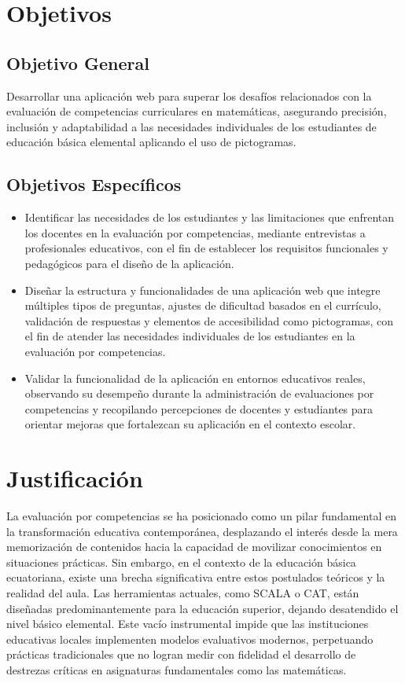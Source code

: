 \section{Objetivos}

\subsection{Objetivo General}

Desarrollar una aplicación web para superar los desafíos relacionados con la evaluación de competencias curriculares en matemáticas, asegurando precisión, inclusión y adaptabilidad a las necesidades individuales de los estudiantes de educación básica elemental aplicando el uso de pictogramas.

\subsection{Objetivos Específicos}

\begin{itemize}[leftmargin=*]
  \item Identificar las necesidades de los estudiantes y las limitaciones que enfrentan los docentes en la evaluación por competencias, mediante entrevistas a profesionales educativos, con el fin de establecer los requisitos funcionales y pedagógicos para el diseño de la aplicación.
  \item Diseñar la estructura y funcionalidades de una aplicación web que integre múltiples tipos de preguntas, ajustes de dificultad basados en el currículo, validación de respuestas y elementos de accesibilidad como pictogramas, con el fin de atender las necesidades individuales de los estudiantes en la evaluación por competencias.
  \item Validar la funcionalidad de la aplicación en entornos educativos reales, observando su desempeño durante la administración de evaluaciones por competencias y recopilando percepciones de docentes y estudiantes para orientar mejoras que fortalezcan su aplicación en el contexto escolar.
\end{itemize}

\section{Justificación}

La evaluación por competencias se ha posicionado como un pilar fundamental en la transformación educativa contemporánea, desplazando el interés desde la mera memorización de contenidos hacia la capacidad de movilizar conocimientos en situaciones prácticas. Sin embargo, en el contexto de la educación básica ecuatoriana, existe una brecha significativa entre estos postulados teóricos y la realidad del aula. Las herramientas actuales, como SCALA o CAT, están diseñadas predominantemente para la educación superior, dejando desatendido el nivel básico elemental. Este vacío instrumental impide que las instituciones educativas locales implementen modelos evaluativos modernos, perpetuando prácticas tradicionales que no logran medir con fidelidad el desarrollo de destrezas críticas en asignaturas fundamentales como las matemáticas.

